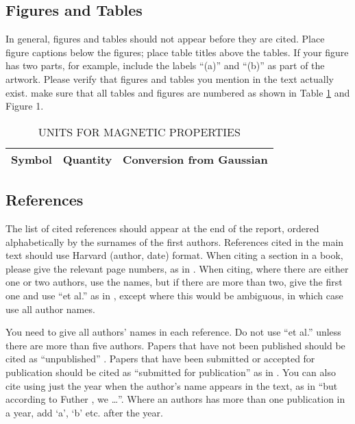 \documentclass[12pt,a4paper]{article}
\begin{document}
\subsection{Figures and Tables}
In general, figures and tables should not appear before they are cited.  Place figure captions below the figures; place table titles above the tables.  If your figure has two parts, for example, include the labels ``(a)'' and ``(b)'' as part of the artwork.  Please verify that figures and tables you mention in the text actually exist.  make sure that all tables and figures are numbered as shown in Table \ref{units} and Figure 1.

\begin{table}[htb]
\centering
\caption{UNITS FOR MAGNETIC PROPERTIES}
\vspace*{6pt}
\label{units}
\begin{tabular}{ccc}\hline\hline
Symbol & Quantity & Conversion from Gaussian \\ \hline
\end{tabular}
\end{table}

\subsection{References}

The list of cited references should appear at the end of the report, ordered alphabetically by the surnames of the first authors.  References cited in the main text should use Harvard (author, date) format.  When citing a section in a book, please give the relevant page numbers, as in \cite[p293]{budgen}.  When citing, where there are either one or two authors, use the names, but if there are more than two, give the first one and use ``et al.'' as in  , except where this would be ambiguous, in which case use all author names.

You need to give all authors' names in each reference.  Do not use ``et al.'' unless there are more than five authors.  Papers that have not been published should be cited as ``unpublished'' \cite{euther}.  Papers that have been submitted or accepted for publication should be cited as ``submitted for publication'' as in \cite{futher} .  You can also cite using just the year when the author's name appears in the text, as in ``but according to Futher \citeyear{futher}, we \dots''.  Where an authors has more than one publication in a year, add `a', `b' etc. after the year.
\end{document}
